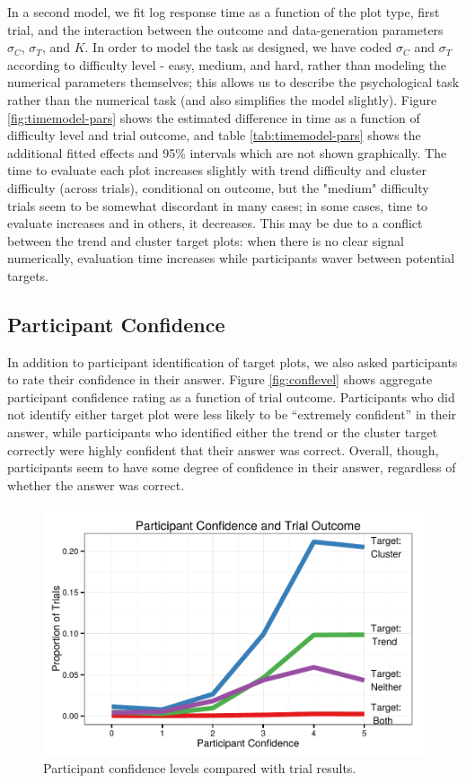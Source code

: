 \documentclass[11pt]{isuthesis}\usepackage[]{graphicx}\usepackage[]{color}
\newenvironment{knitrout}{}{} %
\begin{document}
In a second model, we fit log response time as a function of the plot type, first trial, and the interaction between the outcome and data-generation parameters $\sigma_C$, $\sigma_T$, and $K$. In order to model the task as designed, we have coded $\sigma_C$ and $\sigma_T$ according to difficulty level - easy, medium, and hard, rather than modeling the numerical parameters themselves; this allows us to describe the psychological task rather than the numerical task (and also simplifies the model slightly). Figure \ref{fig:timemodel-pars} shows the estimated difference in time as a function of difficulty level and trial outcome, and table \ref{tab:timemodel-pars} shows the additional fitted effects and 95\% intervals which are not shown graphically. 
The time to evaluate each plot increases slightly with trend difficulty and cluster difficulty (across trials), conditional on outcome, but the "medium" difficulty trials seem to be somewhat discordant in many cases; in some cases, time to evaluate increases and in others, it decreases. This may be due to a conflict between the trend and cluster target plots: when there is no clear signal numerically, evaluation time increases while participants waver between potential targets. 

\subsection{Participant Confidence}
In addition to participant identification of target plots, we also asked participants to rate their confidence in their answer. 
Figure \ref{fig:conflevel} shows aggregate participant confidence rating as a function of trial outcome. 
Participants who did not identify either target plot were less likely to be ``extremely confident'' in their answer, while participants who identified either the trend or the cluster target correctly were highly confident that their answer was correct. 
Overall, though, participants seem to have some degree of confidence in their answer, regardless of whether the answer was correct.

\begin{knitrout}
\color{fgcolor}\begin{figure}

{\centering \includegraphics[width=.5\linewidth]{Figure/FeatureHierarchy/fig-participant-confidence-1} 

}

\caption{Participant confidence levels compared with trial results. \label{fig:conflevel}}\label{fig:participant-confidence}
\end{figure}


\end{knitrout}
\end{document}
